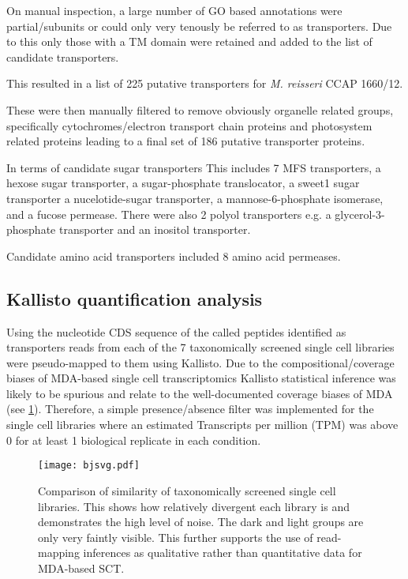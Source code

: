 On manual inspection, a large number of GO based annotations were partial/subunits
or could only very tenously be referred to as transporters. 
Due to this only those with a TM domain were retained and added to the list
of candidate transporters. 

This resulted in a list of 225 putative transporters 
for \textit{M. reisseri} CCAP 1660/12.

These were then manually filtered to remove obviously organelle
related groups, specifically cytochromes/electron transport chain
proteins and photosystem related proteins leading to a final
set of 186 putative transporter proteins.


In terms of candidate sugar transporters 
This includes 7 MFS transporters, a hexose sugar transporter, 
a sugar-phosphate translocator, a sweet1 sugar transporter
a nucelotide-sugar transporter, a mannose-6-phosphate isomerase,
and a fucose permease. 
There were also 2 polyol transporters e.g. a glycerol-3-phosphate transporter
and an inositol transporter.

Candidate amino acid transporters included 8 amino acid
permeases.
%

\subsection{Kallisto quantification analysis}

Using the nucleotide CDS sequence of the called peptides identified as transporters
reads from each of the 7 taxonomically screened single cell libraries were pseudo-mapped
to them using Kallisto. 
Due to the compositional/coverage biases of MDA-based single cell transcriptomics 
Kallisto statistical inference was likely to be spurious and relate to the 
well-documented coverage biases of MDA (see \cref{fig:jsd}). Therefore, a simple presence/absence
filter was implemented for the single cell libraries where an estimated
Transcripts per million (TPM) was above 0 for at least 1 biological replicate
in each condition. 

\begin{figure}
    \centering
	\texttt{[image: bjsvg.pdf]}
    \caption[Jasper-Shannon Divergence of Single Cell Libararies]{Comparison of similarity of 
    taxonomically screened single cell libraries.  This shows how relatively divergent
each library is and demonstrates the high level of noise.  The dark and light groups
are only very faintly visible.  This further supports the use of read-mapping inferences
as qualitative rather than quantitative data for MDA-based SCT.}
\label{fig:jsd}
\end{figure}

